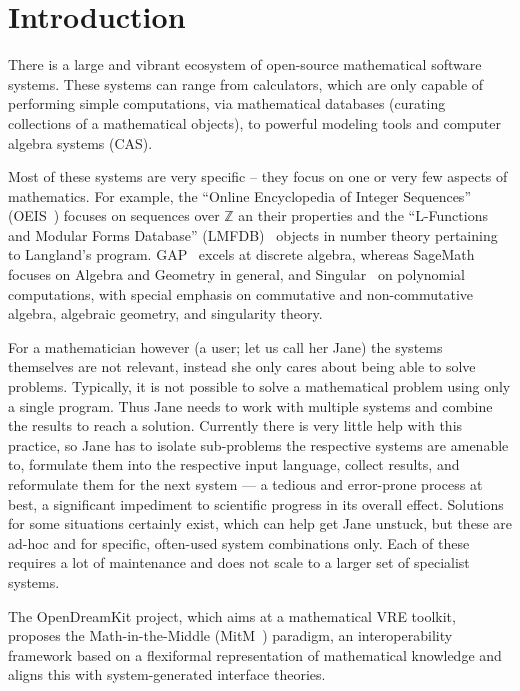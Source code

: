 \section{Introduction}\label{sec:intro}

There is a large and vibrant ecosystem of open-source mathematical software systems. 
These systems can range from calculators, which are only capable of performing simple computations, via mathematical databases (curating collections of a mathematical objects), to powerful modeling tools and computer algebra systems (CAS).

Most of these systems are very specific -- they focus on one or very few aspects of mathematics. 
For example, the ``Online Encyclopedia of Integer Sequences'' (OEIS~\cite{Sloane:oeis12,oeis}) focuses on sequences over $\mathbb{Z}$ an their properties and the ``L-Functions and Modular Forms Database'' (LMFDB)~\cite{Cremona:LMFDB16,lmfdb:on} objects in number theory pertaining to Langland's program. 
GAP~\cite{GAP:on} excels at discrete algebra, whereas SageMath~\cite{SageMath:on} focuses on Algebra and Geometry in general, and Singular~\cite{singular:on} on polynomial computations, with special emphasis on commutative and non-commutative algebra, algebraic geometry, and singularity theory.

For a mathematician however (a user; let us call her Jane) the systems themselves are not relevant, instead she only cares about being able to solve problems. 
Typically, it is not possible to solve a mathematical problem using only a single program. 
Thus Jane needs to work with multiple systems and combine the results to reach a solution. 
Currently there is very little help with this practice, so Jane has to isolate sub-problems the respective systems are amenable to, formulate them into the respective input language, collect results, and reformulate them for the next system --- a tedious and error-prone process at best, a significant impediment to scientific progress in its overall effect. 
Solutions for some situations certainly exist, which can help get Jane unstuck, but these are ad-hoc and for specific, often-used system combinations only. 
Each of these requires a lot of maintenance and does not scale to a larger set of specialist systems. 

The OpenDreamKit project, which aims at a mathematical VRE toolkit, proposes the Math-in-the-Middle (MitM~\cite{DehKohKon:iop16}) paradigm, an interoperability framework based on a flexiformal
representation of mathematical knowledge and aligns this with system-generated interface theories. 

